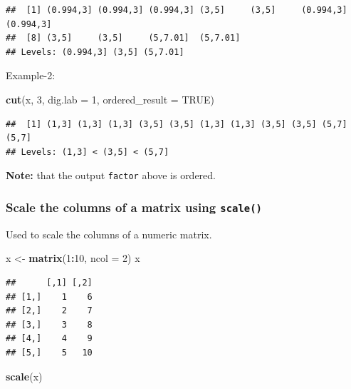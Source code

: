 \documentclass[
]{book}
\newenvironment{Shaded}{\begin{snugshade}}{\end{snugshade}}
\newcommand{\AttributeTok}[1]{\textcolor[rgb]{0.13,0.29,0.53}{#1}}
\newcommand{\ConstantTok}[1]{\textcolor[rgb]{0.56,0.35,0.01}{#1}}
\newcommand{\DecValTok}[1]{\textcolor[rgb]{0.00,0.00,0.81}{#1}}
\newcommand{\FunctionTok}[1]{\textcolor[rgb]{0.13,0.29,0.53}{\textbf{#1}}}
\newcommand{\NormalTok}[1]{#1}
\newcommand{\OtherTok}[1]{\textcolor[rgb]{0.56,0.35,0.01}{#1}}
\newcommand{\SpecialCharTok}[1]{\textcolor[rgb]{0.81,0.36,0.00}{\textbf{#1}}}
\begin{document}
\begin{verbatim}
##  [1] (0.994,3] (0.994,3] (0.994,3] (3,5]     (3,5]     (0.994,3] (0.994,3]
##  [8] (3,5]     (3,5]     (5,7.01]  (5,7.01] 
## Levels: (0.994,3] (3,5] (5,7.01]
\end{verbatim}

Example-2:

\begin{Shaded}
\begin{Highlighting}[]
\FunctionTok{cut}\NormalTok{(x, }\DecValTok{3}\NormalTok{, }\AttributeTok{dig.lab =} \DecValTok{1}\NormalTok{, }\AttributeTok{ordered\_result =} \ConstantTok{TRUE}\NormalTok{)}
\end{Highlighting}
\end{Shaded}

\begin{verbatim}
##  [1] (1,3] (1,3] (1,3] (3,5] (3,5] (1,3] (1,3] (3,5] (3,5] (5,7] (5,7]
## Levels: (1,3] < (3,5] < (5,7]
\end{verbatim}

\textbf{Note:} that the output \texttt{factor} above is ordered.

\hypertarget{scale-the-columns-of-a-matrix-using-scale}{%
\subsubsection*{\texorpdfstring{Scale the columns of a matrix using \texttt{scale()}}{Scale the columns of a matrix using scale()}}\label{scale-the-columns-of-a-matrix-using-scale}}

Used to scale the columns of a numeric matrix.

\begin{Shaded}
\begin{Highlighting}[]
\NormalTok{x }\OtherTok{\textless{}{-}} \FunctionTok{matrix}\NormalTok{(}\DecValTok{1}\SpecialCharTok{:}\DecValTok{10}\NormalTok{, }\AttributeTok{ncol =} \DecValTok{2}\NormalTok{)}
\NormalTok{x}
\end{Highlighting}
\end{Shaded}

\begin{verbatim}
##      [,1] [,2]
## [1,]    1    6
## [2,]    2    7
## [3,]    3    8
## [4,]    4    9
## [5,]    5   10
\end{verbatim}

\begin{Shaded}
\begin{Highlighting}[]
\FunctionTok{scale}\NormalTok{(x)}
\end{Highlighting}
\end{Shaded}
\end{document}
